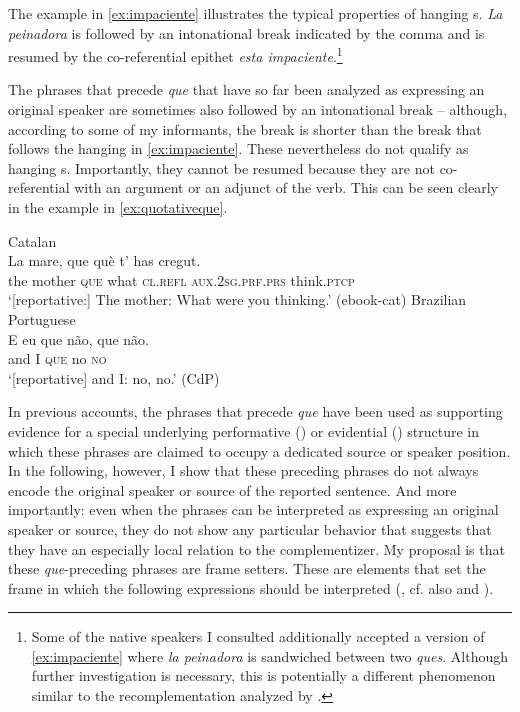 The example in \eqref{ex:impaciente} illustrates the typical properties of hanging s. \emph{La peinadora} is followed by an intonational break  indicated by the comma and  is resumed by the co-referential epithet \emph{esta impaciente}.{\footnote{Some of the native speakers I consulted additionally accepted a version of \eqref{ex:impaciente} where \emph{la peinadora} is sandwiched between two \emph{ques}. Although further investigation is necessary, this is potentially a different phenomenon similar to the recomplementation  analyzed by \citet{VillaGarcia2015}.} }


The phrases that precede \emph{que} that have so far been analyzed as expressing an original speaker are sometimes also followed by an intonational break -- although, according to some of my informants, the break is shorter than the break that follows the hanging   in \eqref{ex:impaciente}.  These nevertheless do not qualify as hanging s. Importantly, they cannot be resumed because they are not  co-ref\-er\-en\-tial with an argument or an adjunct of the verb. This can be seen clearly in the example in  \eqref{ex:quotativeque}.

\ea
	\label{ex:quotativeque}
	
		\ea \label{ex:source}  
		Catalan\\ 
		         \gll  La mare, que què t' has cregut. \\
		the mother \textsc{que} what \textsc{cl.refl} \textsc{aux.2sg.prf.prs} think.\textsc{ptcp}\\
		\glt `[reportative:] The mother:   What were you thinking.’ (ebook-cat)
	\ex \label{ex:source1} Brazilian Portuguese \\
	\gll  E eu que não, que não. \\
	and I \textsc{que} no \textsc{no}\\
	\glt `[reportative] and I: no, no.' (CdP)
	\z
\z

In previous accounts, the phrases that precede \emph{que} have been used as supporting evidence for a special underlying performative (\citealt{DemonteSoriano2014}) or evidential (\citealt{Corr2016}) structure in which these phrases are claimed to  occupy a dedicated source or speaker position.  
 In the following,   however, I show that these preceding phrases do not always encode the original speaker or source of the reported sentence. And more importantly: even when the phrases can be interpreted as expressing an original speaker or source,   they do not show any  particular  behavior that suggests that they  have an especially local relation to the complementizer.   My proposal is that these \emph{que}-preceding phrases are frame setters. These are elements that set the frame in which the following expressions should be interpreted (\citealt{Krifka2008}, cf. also \citealt{Chafe1976} and \citealt{Jacobs2001}).   

